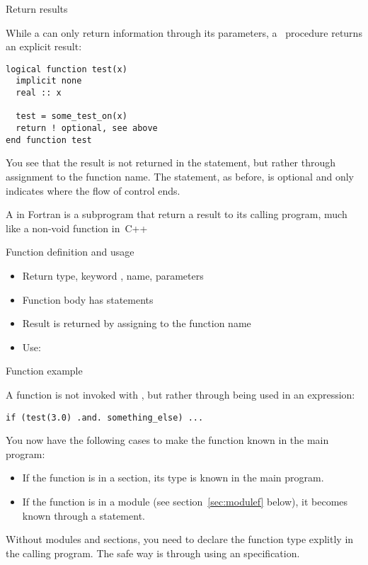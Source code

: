  {Return results}

While a  can only return information through its parameters,
a~ procedure returns an explicit result:
\begin{verbatim}
logical function test(x)
  implicit none
  real :: x

  test = some_test_on(x)
  return ! optional, see above
end function test
\end{verbatim}
You see that the result is not returned in the  statement,
but rather through assignment to the function name. The 
statement, as before, is optional and only indicates where the flow of
control ends.

A  in Fortran is a subprogram that return a
result to its calling program, much like a non-void function in~C++

\begin{block}{Function definition and usage}
  \label{sl:ffunction-def}
  \begin{itemize}
  \item Return type, keyword , name, parameters
  \item Function body has statements
  \item Result is returned by assigning to the function name
  \item Use: 
  \end{itemize}
\end{block}

\begin{block}{Function example}
  \label{sl:ffunction-ex}
\end{block}

A function is not invoked with , but rather through being used
in an expression:
\begin{verbatim}
if (test(3.0) .and. something_else) ...
\end{verbatim}
You now have the following cases to make the function known in the
main program:
\begin{itemize}
\item If the function is in a  section, its type is known
  in the main program.
\item If the function is in a module (see section~\ref{sec:modulef}
  below), it becomes known through a  statement.
\end{itemize}

\begin{f77note}
  Without modules and  sections, you need to declare the
  function type explitly in the calling program. The safe way is
  through using an  specification.
\end{f77note}

